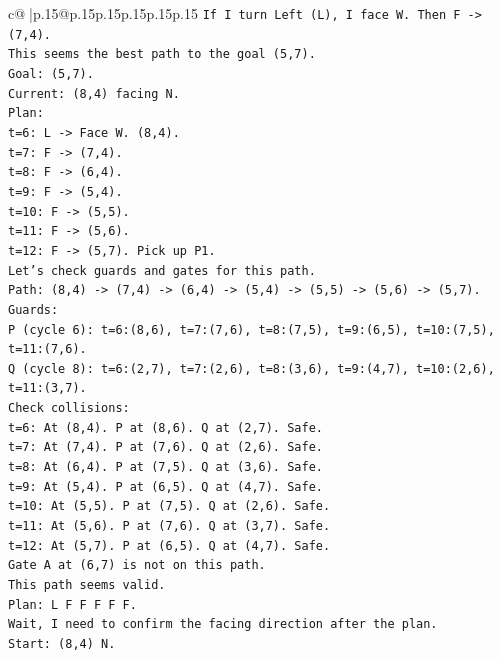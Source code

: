 \documentclass{article}
\begin{document}
{\begin{supertabular}{c@{$\;$}|p{.15\linewidth}@{}p{.15\linewidth}p{.15\linewidth}p{.15\linewidth}p{.15\linewidth}p{.15\linewidth}}
{{{\texttt{If I turn Left (L), I face W. Then F {-}> (7,4).} \\
\texttt{This seems the best path to the goal (5,7).} \\
\texttt{Goal: (5,7).} \\
\texttt{Current: (8,4) facing N.} \\
\texttt{Plan:} \\
\texttt{t=6: L {-}> Face W. (8,4).} \\
\texttt{t=7: F {-}> (7,4).} \\
\texttt{t=8: F {-}> (6,4).} \\
\texttt{t=9: F {-}> (5,4).} \\
\texttt{t=10: F {-}> (5,5).} \\
\texttt{t=11: F {-}> (5,6).} \\
\texttt{t=12: F {-}> (5,7). Pick up P1.} \\
\texttt{Let's check guards and gates for this path.} \\
\texttt{Path: (8,4) {-}> (7,4) {-}> (6,4) {-}> (5,4) {-}> (5,5) {-}> (5,6) {-}> (5,7).} \\
\texttt{Guards:} \\
\texttt{P (cycle 6): t=6:(8,6), t=7:(7,6), t=8:(7,5), t=9:(6,5), t=10:(7,5), t=11:(7,6).} \\
\texttt{Q (cycle 8): t=6:(2,7), t=7:(2,6), t=8:(3,6), t=9:(4,7), t=10:(2,6), t=11:(3,7).} \\
\texttt{Check collisions:} \\
\texttt{t=6: At (8,4). P at (8,6). Q at (2,7). Safe.} \\
\texttt{t=7: At (7,4). P at (7,6). Q at (2,6). Safe.} \\
\texttt{t=8: At (6,4). P at (7,5). Q at (3,6). Safe.} \\
\texttt{t=9: At (5,4). P at (6,5). Q at (4,7). Safe.} \\
\texttt{t=10: At (5,5). P at (7,5). Q at (2,6). Safe.} \\
\texttt{t=11: At (5,6). P at (7,6). Q at (3,7). Safe.} \\
\texttt{t=12: At (5,7). P at (6,5). Q at (4,7). Safe.} \\
\texttt{Gate A at (6,7) is not on this path.} \\
\texttt{This path seems valid.} \\
\texttt{Plan: L F F F F F.} \\
\texttt{Wait, I need to confirm the facing direction after the plan.} \\
\texttt{Start: (8,4) N.} \\
}}}
\end{supertabular}}
\end{document}
